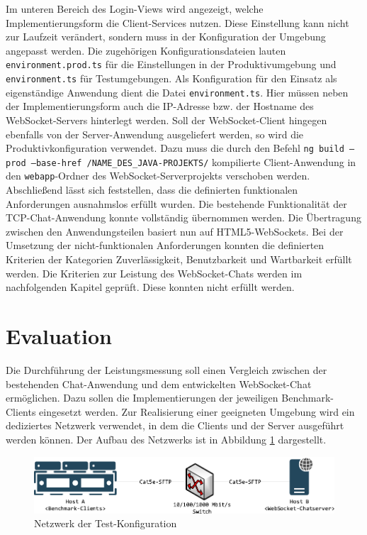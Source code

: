 \documentclass[11pt,a4paper,titlepage]{scrartcl}
\numberwithin{equation}{section}
\begin{document}
\noindent Im unteren Bereich des Login-Views wird angezeigt, welche Implementierungsform die Client-Services nutzen. Diese Einstellung kann nicht zur Laufzeit verändert, sondern muss in der Konfiguration der Umgebung angepasst werden. Die zugehörigen Konfigurationsdateien lauten \texttt{environment.prod.ts} für die Einstellungen in der Produktivumgebung und \texttt{environment.ts} für Testumgebungen. Als Konfiguration für den Einsatz als eigenständige Anwendung dient die Datei \texttt{environment.ts}. Hier müssen neben der Implementierungsform auch die IP-Adresse bzw. der Hostname des WebSocket-Servers hinterlegt werden. Soll der WebSocket-Client hingegen ebenfalls von der Server-Anwendung ausgeliefert werden, so wird die Produktivkonfiguration verwendet. Dazu muss die durch den Befehl \texttt{ng build --prod --base-href /NAME\_DES\_JAVA-PROJEKTS/} kompilierte Client-Anwendung in den \texttt{webapp}-Ordner des WebSocket-Serverprojekts verschoben werden.\\

\noindent Abschließend lässt sich feststellen, dass die definierten funktionalen Anforderungen ausnahmslos erfüllt wurden. Die bestehende Funktionalität der TCP-Chat-Anwendung konnte vollständig übernommen werden. Die Übertragung zwischen den Anwendungsteilen basiert nun auf HTML5-WebSockets. Bei der Umsetzung der nicht-funktionalen Anforderungen konnten die definierten Kriterien der Kategorien Zuverlässigkeit, Benutzbarkeit und Wartbarkeit erfüllt werden. Die Kriterien zur Leistung des WebSocket-Chats werden im nachfolgenden Kapitel geprüft. Diese konnten nicht erfüllt werden.

\newpage
\section{Evaluation}\label{sec:Evaluation}
Die Durchführung der Leistungsmessung soll einen Vergleich zwischen der bestehenden Chat-Anwendung und dem entwickelten WebSocket-Chat ermöglichen. Dazu sollen die Implementierungen der jeweiligen Benchmark-Clients eingesetzt werden. Zur Realisierung einer geeigneten Umgebung wird ein dediziertes Netzwerk verwendet, in dem die Clients und der Server ausgeführt werden können. Der Aufbau des Netzwerks ist in Abbildung \ref{fig:evalNetwork} dargestellt.
\medskip
\begin{figure}[ht] 
	\begin{center}
		\includegraphics[scale=1]{img/umgebung.pdf}
		\caption{Netzwerk der Test-Konfiguration}
		\label{fig:evalNetwork}
	\end{center}
\end{figure}
\end{document}
